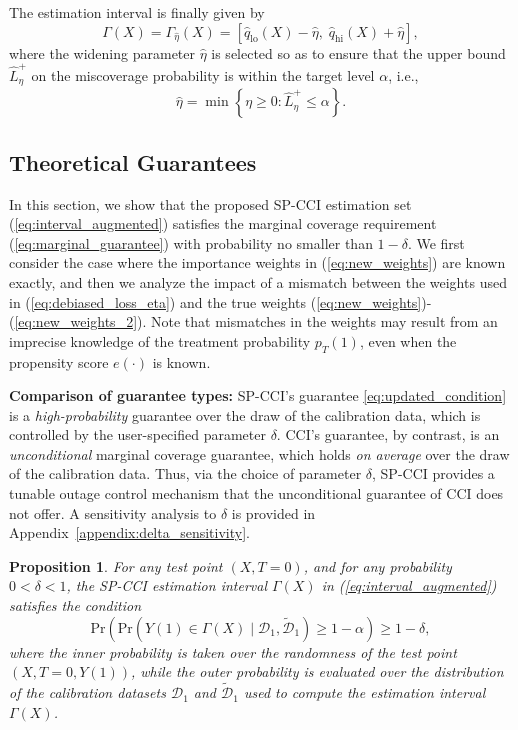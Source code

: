 \documentclass{article}
\theoremstyle{plain}
\newtheorem{proposition}[theorem]{Proposition}
\theoremstyle{definition}
\theoremstyle{remark}
\begin{document}
The estimation interval is finally given by
\begin{equation}
\label{eq:interval_augmented}
\Gamma(X) = \Gamma_{\hat{\eta}}(X) = [\hat{q}_{\text{lo}}(X) - \hat{\eta},\; \hat{q}_{\text{hi}}(X) + \hat{\eta}],
\end{equation}
where the widening parameter $\hat{\eta}$ is selected so as to ensure that the upper bound $\hat{L}^+_\eta$ on the miscoverage probability is within the target level \( \alpha \), i.e., \citep{einbinder2024semi}
\begin{equation}
\label{eq:eta}
    \hat{\eta} = \min\left\{ \eta \geq 0 : \hat{L}^+_\eta \leq \alpha \right\}.
\end{equation}


\subsection{Theoretical Guarantees}
\label{sec:theoretical_guarantees}

In this section, we show that the proposed SP-CCI estimation set (\ref{eq:interval_augmented}) satisfies the marginal coverage requirement (\ref{eq:marginal_guarantee}) with probability no smaller than $1-\delta$. We first consider the case where the importance weights in (\ref{eq:new_weights}) are known exactly, and then we analyze the impact of a mismatch between the weights used in (\ref{eq:debiased_loss_eta}) and the true weights (\ref{eq:new_weights})-(\ref{eq:new_weights_2}). Note that mismatches in the weights may result from an imprecise knowledge of the treatment probability $p_T (1)$, even when the propensity score $e(\cdot)$ is known.

\textbf{Comparison of guarantee types:} SP-CCI's guarantee \eqref{eq:updated_condition} is a \emph{high-probability} guarantee over the draw of the calibration data, which is controlled by the user-specified parameter $\delta$. CCI's guarantee, by contrast, is an \emph{unconditional} marginal coverage guarantee, which holds \emph{on average} over the draw of the calibration data. Thus, via the choice of parameter $\delta$, SP-CCI provides a tunable outage control mechanism that the unconditional guarantee of CCI does not offer. A sensitivity analysis to $\delta$ is provided in Appendix~\ref{appendix:delta_sensitivity}.



\begin{proposition}
\label{prop:1}
    For any test point $(X,T = 0)$, and for any probability $0<\delta<1$, the SP-CCI estimation interval $\Gamma(X)$ in (\ref{eq:interval_augmented}) satisfies the condition
\begin{equation}
\label{eq:updated_condition}
    \mathrm{Pr}\left(\mathrm{Pr}\left(Y(1)\in \Gamma(X)\mid \mathcal{D}_1, \tilde{\mathcal{D}}_1\right)\geq 1- \alpha\right)\geq 1-\delta,
\end{equation}
where the inner probability is taken over the randomness of the test point $(X, T = 0, Y(1))$, while the outer probability is evaluated over the distribution of the calibration datasets $\mathcal{D}_1$ and $\tilde{\mathcal{D}}_1$ used to compute the estimation interval $\Gamma(X)$.
\end{proposition}
\end{document}
